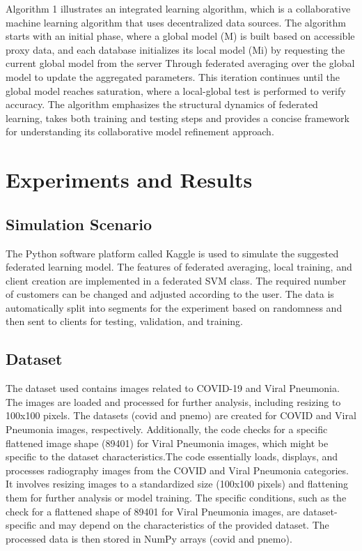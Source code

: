 \documentclass[conference]{IEEEtran}
\begin{document}
Algorithm 1 illustrates an integrated learning algorithm, which is a collaborative machine learning algorithm that uses decentralized data sources. The algorithm starts with an initial phase, where a global model (M) is built based on accessible proxy data, and each database initializes its local model (Mi) by requesting the current global model from the server Through federated averaging over the global model to update the aggregated parameters. This iteration continues until the global model reaches saturation, where a local-global test is performed to verify accuracy. The algorithm emphasizes the structural dynamics of federated learning, takes both training and testing steps and provides a concise framework for understanding its collaborative model refinement approach.

\section{Experiments and Results}

\subsection{Simulation Scenario}
The Python software platform called Kaggle is used to simulate the suggested federated learning model. The features of federated averaging, local training, and client creation are implemented in a federated SVM class. The required number of customers can be changed and adjusted according to the user. The data is automatically split into segments for the experiment based on randomness and then sent to clients for testing, validation, and training.

\subsection{Dataset}

The dataset used contains images related to COVID-19 and Viral Pneumonia. The images are loaded and processed for further analysis, including resizing to 100x100 pixels. The datasets (covid and pnemo) are created for COVID and Viral Pneumonia images, respectively. Additionally, the code checks for a specific flattened image shape (89401) for Viral Pneumonia images, which might be specific to the dataset characteristics.The code essentially loads, displays, and processes radiography images from the COVID and Viral Pneumonia categories. It involves resizing images to a standardized size (100x100 pixels) and flattening them for further analysis or model training. The specific conditions, such as the check for a flattened shape of 89401 for Viral Pneumonia images, are dataset-specific and may depend on the characteristics of the provided dataset. The processed data is then stored in NumPy arrays (covid and pnemo).
\end{document}
